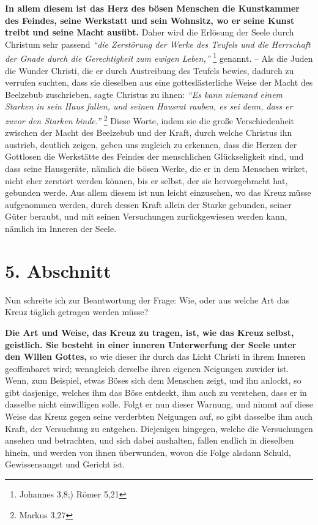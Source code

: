 \label{ref:03_04_reich_des_boesen}
\textbf{In allem diesem ist das Herz des bösen Menschen die Kunstkammer des
Feindes, seine Werkstatt und sein Wohnsitz, wo er seine Kunst treibt und seine
Macht ausübt.} Daher wird die Erlösung der Seele durch Christum sehr passend
\textit{"`die Zerstörung der Werke des Teufels und die Herrschaft der Gnade
durch die Gerechtigkeit zum ewigen Leben,"'}
\footnote{Johannes 3,8;) Römer 5,21}
genannt. -- Als
die Juden die Wunder Christi, die er durch Austreibung des Teufels bewies,
dadurch zu verrufen suchten, dass sie dieselben aus eine gotteslästerliche Weise
der Macht des Beelzebub zuschrieben, sagte Christus zu ihnen:
\textit{"`Es kann niemand einem Starken in sein Haus fallen, und seinen
Hausrat rauben, es sei denn, dass er zuvor den Starken binde."'}
\footnote{Markus 3,27}
Diese Worte, indem sie die
große Verschiedenheit zwischen der Macht des Beelzebub und der Kraft, durch
welche Christus ihn austrieb, deutlich zeigen, geben uns zugleich zu erkennen,
dass die Herzen der Gottlosen die Werkstätte des Feindes der menschlichen
Glückseligkeit sind, und dass seine Hausgeräte, nämlich die bösen Werke, die er
in dem Menschen wirket, nicht eher zerstört werden können, bis er selbst, der
sie hervorgebracht hat, gebunden werde. Aus allem diesem ist nun leicht
einzusehen, wo das Kreuz müsse aufgenommen werden, durch dessen Kraft allein der
Starke gebunden, seiner Güter beraubt, und mit seinen Versuchungen
zurückgewiesen werden kann, nämlich im Inneren der Seele.

\section{5. Abschnitt} \label{kap3_ab5}

Nun schreite ich zur Beantwortung der Frage: Wie, oder aus welche Art das Kreuz
täglich getragen werden müsse?

\medskip

\label{ref:03_05_kreuz_auf_sich_nehmen}
\textbf{Die Art und Weise, das Kreuz zu tragen, ist, wie das Kreuz selbst,
geistlich.
Sie besteht in einer inneren Unterwerfung der Seele unter den Willen Gottes,} so
wie dieser ihr durch das Licht Christi in ihrem Inneren geoffenbaret wird;
wenngleich derselbe ihren eigenen Neigungen zuwider ist. Wenn, zum Beispiel,
etwas Böses sich dem Menschen zeigt, und ihn anlockt, so gibt dasjenige,
welches ihm das Böse entdeckt, ihm auch zu verstehen, dass er in dasselbe nicht
einwilligen solle. Folgt er nun dieser Warnung, und nimmt auf diese Weise das
Kreuz gegen seine verderbten Neigungen auf, so gibt dasselbe ihm auch Kraft,
der Versuchung zu entgehen. Diejenigen hingegen, welche die Versuchungen ansehen
und betrachten, und sich dabei aushalten, fallen endlich in dieselben hinein,
und werden von ihnen überwunden, wovon die Folge alsdann Schuld, Gewissensangst
und Gericht ist.


